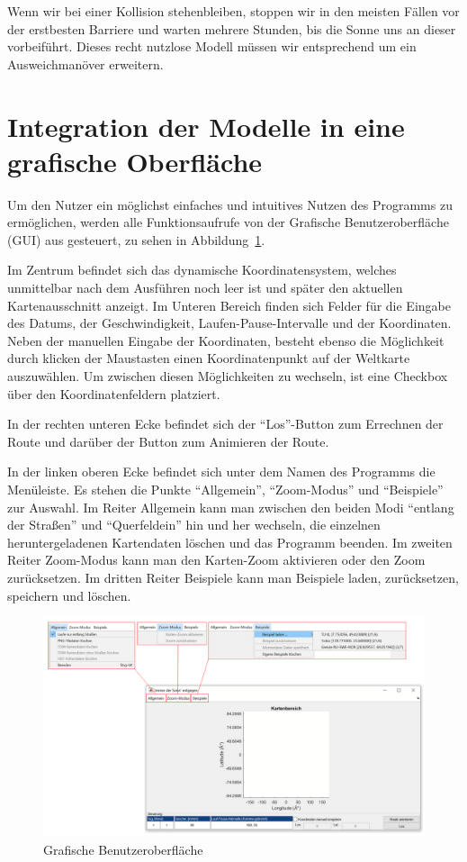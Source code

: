 \documentclass[
    paper=a4,
    DIV14,
    fontsize=12pt,
    pagesize=pdftex,
    toc=bibliographynumbered
]{scrartcl}
\numberwithin{figure}{section}
\numberwithin{equation}{section}
\numberwithin{table}{section}
\begin{document}
Wenn wir bei einer Kollision stehenbleiben, stoppen wir in den meisten Fällen vor der
erstbesten Barriere und warten mehrere Stunden, bis die Sonne uns an dieser vorbeiführt.
Dieses recht nutzlose Modell müssen wir entsprechend um ein Ausweichmanöver erweitern.

\section{Integration der Modelle in eine grafische Oberfläche}
\label{sec:gui}

Um den Nutzer ein möglichst einfaches und intuitives Nutzen des Programms zu ermöglichen,
werden alle Funktionsaufrufe von der Grafische Benutzeroberfläche (GUI) aus gesteuert,
zu sehen in Abbildung~\ref{fig:GUI}.

Im Zentrum befindet sich das dynamische Koordinatensystem, welches unmittelbar nach dem
Ausführen noch leer ist und später den aktuellen Kartenausschnitt anzeigt. Im Unteren
Bereich finden sich Felder für die Eingabe des Datums, der Geschwindigkeit,
Laufen-Pause-Intervalle und der Koordinaten. Neben der manuellen Eingabe der Koordinaten,
besteht ebenso die Möglichkeit durch klicken der Maustasten einen Koordinatenpunkt auf der
Weltkarte auszuwählen. Um zwischen diesen Möglichkeiten zu wechseln, ist eine Checkbox
über den Koordinatenfeldern platziert.

In der rechten unteren Ecke befindet sich der \enquote{Los}-Button zum Errechnen der Route
und darüber der Button zum Animieren der Route.

In der linken oberen Ecke befindet sich unter dem Namen des Programms die Menüleiste. Es
stehen die Punkte \enquote{Allgemein}, \enquote{Zoom-Modus} und \enquote{Beispiele} zur
Auswahl. Im Reiter Allgemein kann man zwischen den beiden Modi \enquote{entlang der
Straßen} und \enquote{Querfeldein} hin und her wechseln, die einzelnen heruntergeladenen
Kartendaten löschen und das Programm beenden. Im zweiten Reiter Zoom-Modus kann man den
Karten-Zoom aktivieren oder den Zoom zurücksetzen. Im dritten Reiter Beispiele kann man
Beispiele laden, zurücksetzen, speichern und löschen.

\begin{figure}[htb]
    \centering
    \includegraphics[width=1\textwidth]{images/gui.png}
    \caption{Grafische Benutzeroberfläche}
    \label{fig:GUI}
\end{figure}
\end{document}
